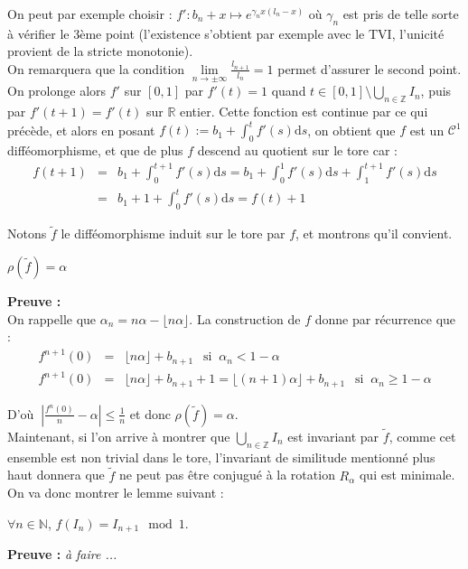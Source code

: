 \documentclass[11pt,a4paper]{article}
\begin{document}
On peut par exemple choisir : $f': b_n + x \mapsto \displaystyle e^{\gamma_n x (l_n -x)} $ où $\gamma_n$ est pris de telle sorte à vérifier le 3ème point (l'existence s'obtient par exemple avec le TVI, l'unicité provient de la stricte monotonie). \\ 
On remarquera que la condition $\displaystyle \lim\limits_{n \to \pm \infty } \frac{l_{n+1}}{l_n} = 1 $ permet d'assurer le second point. \\

On prolonge alors $f'$ sur $[0,1]$ par $f'(t)=1$ quand $\displaystyle t\in [0,1] \setminus \bigcup_{n\in \mathbb{Z}} I_n$, puis par $f'(t+1)=f'(t)$ sur $\mathbb{R}$ entier. Cette fonction est continue par ce qui précède, et alors en posant $f(t) := b_1 + \displaystyle \int_0^t f'(s) \mathrm{d}s$, on obtient que $f$ est un $\mathcal{C}^1$ difféomorphisme, et que de plus $f$ descend au quotient sur le tore car : \\
\begin{eqnarray*}
f(t+1) &=& b_1 +  \int_0^{t+1} f'(s) \mathrm{d}s = b_1 + \int_0^1 f'(s) \mathrm{d}s + \int_1^{t+1} f'(s) \mathrm{d}s \\
&=& b_1 + 1 + \int_0^t f'(s) \mathrm{d}s = f(t) + 1
\end{eqnarray*}

Notons $\tilde{f}$ le difféomorphisme induit sur le tore par $f$, et montrons qu'il convient. 

\begin{lemma} $\rho(\tilde{f})=\alpha$
\end{lemma}

\textbf{Preuve :} \\
On rappelle que $\alpha_n = n\alpha - \lfloor n\alpha \rfloor$. La construction de $f$ donne par récurrence que :
\begin{eqnarray*}
f^{n+1}(0) &=& \lfloor n\alpha \rfloor + b_{n+1} \ \ \text{ si } \ \alpha_n < 1-\alpha \\
f^{n+1}(0) &=&  \lfloor n\alpha \rfloor + b_{n+1} + 1 =  \lfloor (n+1)\alpha \rfloor + b_{n+1}\ \ \text{ si } \ \alpha_n \geq 1-\alpha
\end{eqnarray*}

D'où $ \ \displaystyle |\frac{f^n(0)}{n} - \alpha| \leq \frac{1}{n}$ et donc $\rho(\tilde{f})=\alpha$. \\


Maintenant, si l'on arrive à montrer que $\bigcup_{n\in \mathbb{Z}} I_n$ est invariant par $\tilde{f}$, comme cet ensemble est non trivial dans le tore, l'invariant de similitude mentionné plus haut donnera que $\tilde{f}$ ne peut pas être conjugué à la rotation $R_\alpha$ qui est minimale. On va donc montrer le lemme suivant :

\begin{lemma} $\forall n \in \mathbb{N}$, $f(I_n)=I_{n+1} \mod 1$.
\end{lemma}


\textbf{Preuve :} \textit{à faire ...}

\newpage
\printbibliography[heading=bibintoc, title={Références}]
\end{document}
